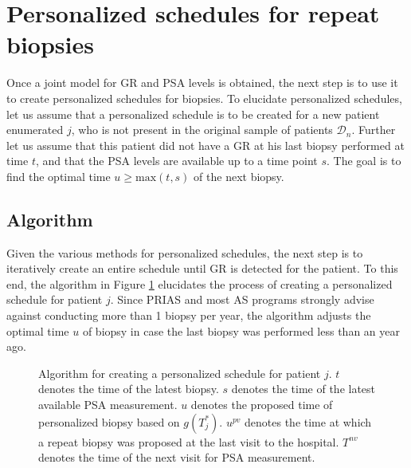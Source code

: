 \section{Personalized schedules for repeat biopsies}
\label{sec : pers_sched_approaches}
Once a joint model for GR and PSA levels is obtained, the next step is to use it to create personalized schedules for biopsies. To elucidate personalized schedules, let us assume that a personalized schedule is to be created for a new patient enumerated $j$, who is not present in the original sample of patients $\mathcal{D}_n$. Further let us assume that this patient did not have a GR at his last biopsy performed at time $t$, and that the PSA levels are available up to a time point $s$. The goal is to find the optimal time $u \geq \text{max}(t,s)$ of the next biopsy. 





\subsection{Algorithm}
\label{subsec : pers_sched_algorithm}
Given the various methods for personalized schedules, the next step is to iteratively create an entire schedule until GR is detected for the patient. To this end, the algorithm in Figure \ref{fig : sched_algorithm} elucidates the process of creating a personalized schedule for patient $j$. Since PRIAS and most AS programs strongly advise against conducting more than 1 biopsy per year, the algorithm adjusts the optimal time $u$ of biopsy in case the last biopsy was performed less than an year ago.

\begin{figure}
\label{fig : sched_algorithm}
\centerline{}
\caption{Algorithm for creating a personalized schedule for patient $j$. $t$ denotes the time of the latest biopsy. $s$ denotes the time of the latest available PSA measurement. $u$ denotes the proposed time of personalized biopsy based on $g(T^*_j)$.  $u^{pv}$ denotes the time at which a repeat biopsy was proposed at the last visit to the hospital. $T^{nv}$ denotes the time of the next visit for PSA measurement.} 
\end{figure}